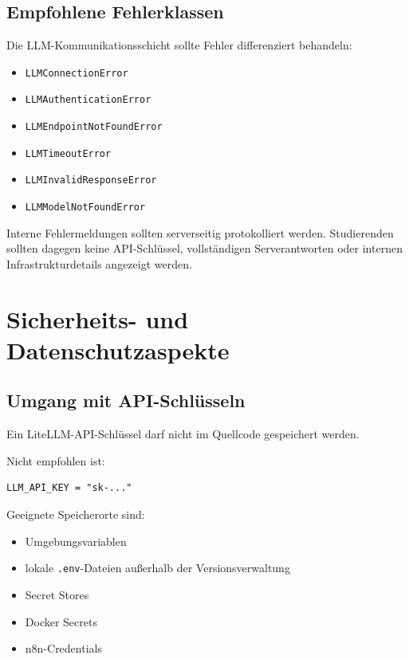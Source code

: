 \documentclass[11pt,a4paper,oneside,ngerman]{memoir}
\begin{document}
\section{Empfohlene Fehlerklassen}

Die LLM-Kommunikationsschicht sollte Fehler differenziert behandeln:

\begin{itemize}
    \item \texttt{LLMConnectionError}
    \item \texttt{LLMAuthenticationError}
    \item \texttt{LLMEndpointNotFoundError}
    \item \texttt{LLMTimeoutError}
    \item \texttt{LLMInvalidResponseError}
    \item \texttt{LLMModelNotFoundError}
\end{itemize}

Interne Fehlermeldungen sollten serverseitig protokolliert werden. Studierenden sollten dagegen keine API-Schlüssel, vollständigen Serverantworten oder internen Infrastrukturdetails angezeigt werden.

\chapter{Sicherheits- und Datenschutzaspekte}

\section{Umgang mit API-Schlüsseln}

Ein LiteLLM-API-Schlüssel darf nicht im Quellcode gespeichert werden.

Nicht empfohlen ist:

\begin{verbatim}
LLM_API_KEY = "sk-..."
\end{verbatim}

Geeignete Speicherorte sind:

\begin{itemize}
    \item Umgebungsvariablen
    \item lokale \texttt{.env}-Dateien außerhalb der Versionsverwaltung
    \item Secret Stores
    \item Docker Secrets
    \item n8n-Credentials
\end{itemize}
\end{document}
